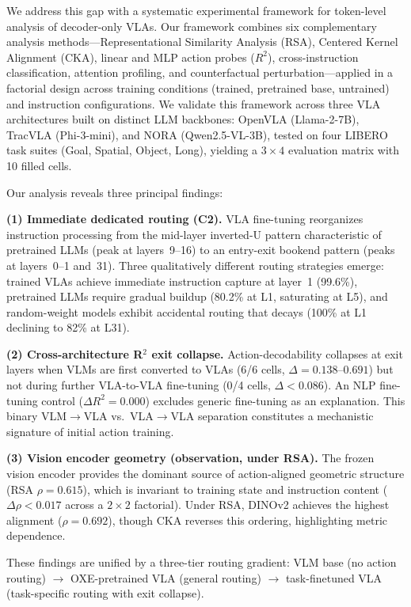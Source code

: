 \documentclass[10pt,twocolumn]{article}
\begin{document}
We address this gap with a systematic experimental framework for token-level analysis of decoder-only VLAs.
Our framework combines six complementary analysis methods---Representational Similarity Analysis (RSA), Centered Kernel Alignment (CKA), linear and MLP action probes ($R^2$), cross-instruction classification, attention profiling, and counterfactual perturbation---applied in a factorial design across training conditions (trained, pretrained base, untrained) and instruction configurations.
We validate this framework across three VLA architectures built on distinct LLM backbones: OpenVLA (Llama-2-7B), TracVLA (Phi-3-mini), and NORA (Qwen2.5-VL-3B), tested on four LIBERO task suites (Goal, Spatial, Object, Long), yielding a $3 \times 4$ evaluation matrix with 10 filled cells.

Our analysis reveals three principal findings:

\textbf{(1) Immediate dedicated routing (C2).}
VLA fine-tuning reorganizes instruction processing from the mid-layer inverted-U pattern characteristic of pretrained LLMs (peak at layers~9--16) to an entry-exit bookend pattern (peaks at layers~0--1 and~31).
Three qualitatively different routing strategies emerge: trained VLAs achieve immediate instruction capture at layer~1 (99.6\%), pretrained LLMs require gradual buildup (80.2\% at L1, saturating at L5), and random-weight models exhibit accidental routing that decays (100\% at L1 declining to 82\% at L31).

\textbf{(2) Cross-architecture R$^2$ exit collapse.}
Action-decodability collapses at exit layers when VLMs are first converted to VLAs (6/6 cells, $\Delta = 0.138$--$0.691$) but not during further VLA-to-VLA fine-tuning (0/4 cells, $\Delta < 0.086$).
An NLP fine-tuning control ($\Delta R^2 = 0.000$) excludes generic fine-tuning as an explanation.
This binary VLM$\to$VLA vs.\ VLA$\to$VLA separation constitutes a mechanistic signature of initial action training.

\textbf{(3) Vision encoder geometry (observation, under RSA).}
The frozen vision encoder provides the dominant source of action-aligned geometric structure (RSA $\rho = 0.615$), which is invariant to training state and instruction content ($\Delta\rho < 0.017$ across a $2 \times 2$ factorial).
Under RSA, DINOv2 achieves the highest alignment ($\rho = 0.692$), though CKA reverses this ordering, highlighting metric dependence.

These findings are unified by a three-tier routing gradient: VLM base (no action routing) $\to$ OXE-pretrained VLA (general routing) $\to$ task-finetuned VLA (task-specific routing with exit collapse).
\end{document}
